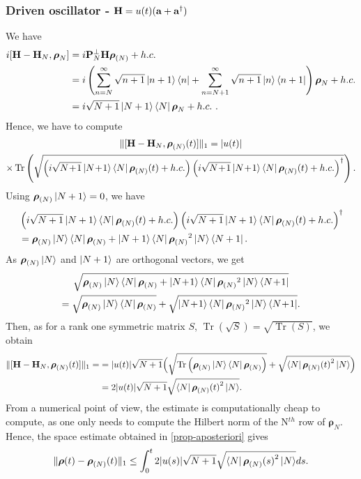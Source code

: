 \documentclass[a4paper,onecolumn,amsmath,amssymb,amsfonts,accepted=2026-03-06]{quantumarticle}
\newcommand{\xtr}[1]{\operatorname{Tr}\left(#1 \right)}
\newcommand{\Hamil}{{\bf H}}
\newcommand{\Proj}[1]{\mathbf{P}_{#1}}
\newcommand{\destroy}{{\bf a}}
\newcommand{\create}{{\bf a^\dag}}
\newcommand{\rN}{{\boldsymbol{\rho}_{(N)}}}
\begin{document}
\subsubsection{\texorpdfstring{Driven oscillator - $\Hamil = u(t)(\destroy + \create)$}{Driven oscillator}}
\label{ex:aplusadag}
We have
\begin{align}
    \notag i[\Hamil - \Hamil_N,\boldsymbol{\rho}_N]&=i\Proj{N}^\perp \Hamil \rN +h.c.\\
    \notag &=i\left( \sum_{n=N}^\infty \sqrt{n+1}\ket{n+1}\bra{n} + \sum_{n=N+1}^\infty\sqrt{n+1}\ket{n}\bra{n+1}\right)\boldsymbol{\rho}_N + h.c.\\
    &=i\sqrt{N+1}\ket{N+1}\bra{N}\boldsymbol{\rho}_N + h.c.\ .
\end{align}
Hence, we have to compute
\begin{multline}
    \|[\Hamil-\Hamil_N,\rN(t)]\|_1=|u(t)| \\
    \times\xtr{\sqrt{\left(i\sqrt{N\!+\!1}\ket{N\!+\!1}\bra{N}\rN(t) + h.c.\right)\left(i\sqrt{N\!+\!1}\ket{N\!+\!1}\bra{N}\rN(t) + h.c.\right)^{\dag}}}.
\end{multline}
Using $\rN \ket{N+1}=0$, we have
\begin{align}
    \notag &\left(i\sqrt{N+1}\ket{N+1}\bra{N}\rN(t) + h.c.\right)\left(i\sqrt{N+1}\ket{N+1}\bra{N}\rN(t) + h.c.\right)^{\dag}\\
    &=\rN\ket{N}\bra{N}\rN + \ket{N+1}\bra{N}\rN^2\ket{N}\bra{N+1}.
\end{align}
As $\rN \ket{N}$ and $\ket{N+1}$ are orthogonal vectors, we get
\begin{multline}
    \sqrt{\rN\ket{N}\bra{N}\rN + \ket{N\!+\!1}\bra{N}\rN^2\ket{N}\bra{N\!+\!1}}\\
    = \sqrt{\rN\ket{N}\bra{N}\rN} + \sqrt{\ket{N\!+\!1}\bra{N}\rN^2\ket{N}\bra{N\!+\!1}}.
\end{multline}
Then, as for a rank one symmetric matrix $S$, $\xtr{\sqrt{S}}=\sqrt{\xtr{S}}$, we obtain
\begin{align}
    \notag \|[\Hamil-\Hamil_N,\rN(t)]\|_1=&=|u(t)|\sqrt{N+1} \Bigl( \sqrt{\xtr{
    \rN\ket{N}\bra{N}\rN}} + \sqrt{\bra{N}{\rN(t)}^2 \ket{N}}\Bigr)\\
    &=2|u(t)|\sqrt{N+1} \sqrt{\bra{N}{\rN(t)}^2 \ket{N}}.
\end{align}
From a numerical point of view, the estimate is computationally cheap to compute, as one only needs to compute the Hilbert norm of the N$^{th}$ row of $\boldsymbol{\rho}_N$. Hence, the space estimate obtained in \cref{prop-aposteriori} gives
\begin{align}
    \|\boldsymbol{\rho}(t)-\rN(t)\|_1 \leq \int_0^t 2|u(s)|\sqrt{N+1} \sqrt{\bra{N}{\rN(s)}^2 \ket{N}}ds.
\end{align}
\end{document}
